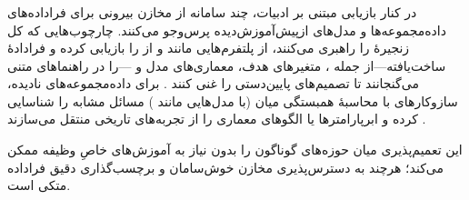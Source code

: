 \subsubsection{\protect{}}

در کنار بازیابی مبتنی بر ادبیات، چند سامانه از مخازن بیرونی برای فراداده‌های داده‌مجموعه‌ها و مدل‌های ازپیش‌آموزش‌دیده پرس‌وجو می‌کنند. چارچوب‌هایی که کل زنجیرهٔ  را راهبری می‌کنند،  از پلتفرم‌هایی مانند  و  از  را بازیابی کرده و فرادادهٔ ساخت‌یافته—از جمله ، متغیرهای هدف، معماری‌های مدل و —را در راهنماهای متنی می‌گنجانند تا تصمیم‌های پایین‌دستی را غنی کنند \cite{trirat2025automlagent, shen2023HuggingGPT}. برای داده‌مجموعه‌های نادیده، سازوکارهای  با محاسبهٔ همبستگی میان  (با مدل‌هایی مانند ) مسائل مشابه را شناسایی کرده و ابرپارامترها یا الگوهای معماری را از تجربه‌های تاریخی منتقل می‌سازند \cite{zhang2023AutomlGPTAutomaticMachineLearning}.

این  تعمیم‌پذیری میان حوزه‌های گوناگون را بدون نیاز به آموزش‌های خاصِ وظیفه ممکن می‌کند؛ هرچند به دسترس‌پذیری مخازن خوش‌سامان و برچسب‌گذاری دقیق فراداده متکی است.

\subsubsection{\protect{}}

